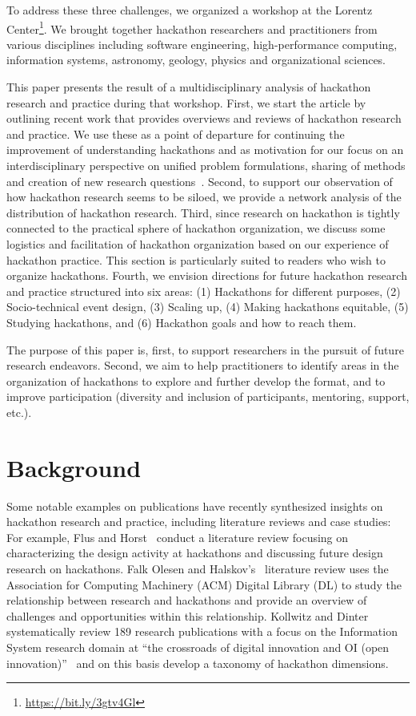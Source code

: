 \documentclass{ieeeaccess}
\begin{document}
To address these three challenges, we organized a workshop at the Lorentz Center\footnote{\href{https://bit.ly/3gtv4Gl}{https://bit.ly/3gtv4Gl}}. 
We brought together hackathon researchers and practitioners from various disciplines including software engineering, high-performance computing, information systems, astronomy, geology, physics and organizational sciences. 

This paper presents the result of a multidisciplinary analysis of hackathon research and practice during that workshop. 
First, we start the article by outlining recent work that provides overviews and reviews of hackathon research and practice.
We use these as a point of departure for continuing the improvement of understanding hackathons and as motivation for our focus on an interdisciplinary perspective on unified problem formulations, sharing of methods and creation of new research questions~\cite{miller2008epistemological,eigenbrode2007employing}. 
Second, to support our observation of how hackathon research seems to be siloed, we provide a network analysis of the distribution of hackathon research.
Third, since research on hackathon is tightly connected to the practical sphere of hackathon organization, we discuss some logistics and facilitation of hackathon organization based on our experience of hackathon practice.
This section is particularly suited to readers who wish to organize hackathons. 
Fourth, we envision directions for future hackathon research and practice structured into six areas:
(1) Hackathons for different purposes, 
(2) Socio-technical event design, 
(3) Scaling up, 
(4) Making hackathons equitable, 
(5) Studying hackathons, and
(6) Hackathon goals and how to reach them.

The purpose of this paper is, first, to support researchers in the pursuit of future research endeavors. 
Second, we aim to help practitioners to identify areas in the organization of hackathons to explore and further develop the format, and to improve participation (diversity and inclusion of participants, mentoring, support, etc.).

\section{Background}
\label{sec:background}
Some notable examples on publications have recently synthesized insights on hackathon research and practice, including literature reviews and case studies:
For example, Flus and Horst~\cite{flus2021design} conduct a literature review focusing on characterizing the design activity at hackathons and discussing future design research on hackathons.
Falk Olesen and Halskov's~\cite{falk202010} literature review uses the Association for Computing Machinery (ACM) Digital Library (DL) to study the relationship between research and hackathons and provide an overview of challenges and opportunities within this relationship.
Kollwitz and Dinter~\cite{kollwitz2019hack} systematically review 189 research publications with a focus on the Information System research domain at ``the crossroads of digital innovation and OI (open innovation)''~\cite{kollwitz2019hack} and on this basis develop a taxonomy of hackathon dimensions.
\end{document}

